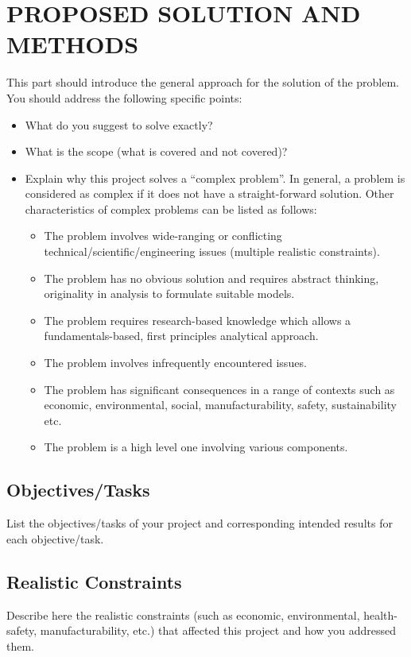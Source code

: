 \documentclass[12pt,a4paper]{article}
\begin{document}
\section{PROPOSED SOLUTION AND METHODS}
This part should introduce the general approach for the solution of the problem. You should address the following specific points:

\begin{itemize}[leftmargin=1.5em]
    \item What do you suggest to solve exactly?
    \item What is the scope (what is covered and not covered)?
    \item Explain why this project solves a ``complex problem''. In general, a problem is considered as complex if it does not have a straight-forward solution. Other characteristics of complex problems can be listed as follows:
    \begin{itemize}[leftmargin=1.5em]
        \item The problem involves wide-ranging or conflicting technical/scientific/engineering issues (multiple realistic constraints).
        \item The problem has no obvious solution and requires abstract thinking, originality in analysis to formulate suitable models.
        \item The problem requires research-based knowledge which allows a fundamentals-based, first principles analytical approach.
        \item The problem involves infrequently encountered issues.
        \item The problem has significant consequences in a range of contexts such as economic, environmental, social, manufacturability, safety, sustainability etc.
        \item The problem is a high level one involving various components.
    \end{itemize}
\end{itemize}

\subsection{Objectives/Tasks}
List the objectives/tasks of your project and corresponding intended results for each objective/task.

\subsection{Realistic Constraints}
Describe here the realistic constraints (such as economic, environmental, health-safety, manufacturability, etc.) that affected this project and how you addressed them.
\end{document}
